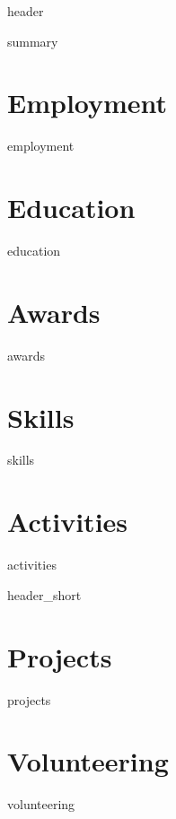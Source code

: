 \documentclass[11pt]{article}
\begin{document}
{header}

{summary}

\section{Employment}
{employment}

\section{Education}
{education}

\section{Awards}
{awards}

\section{Skills}
{skills}

\section{Activities}
{activities}


\pagebreak

{header_short}

\section{Projects}
{projects}

\section{Volunteering}
{volunteering}
\end{document}

